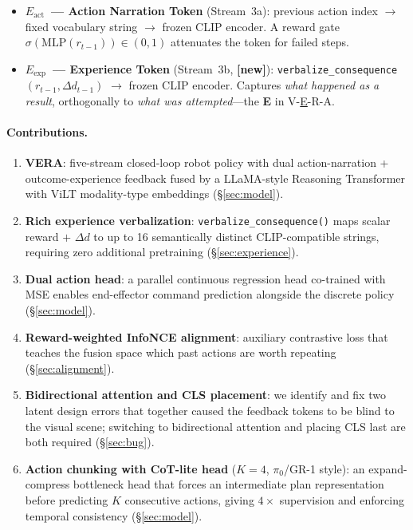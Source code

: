 \documentclass{article}
\newcommand{\modelname}{\textsc{VERA}\xspace}
\newcommand{\Lact}{$E_{\mathrm{act}}$\xspace}
\newcommand{\Lexp}{$E_{\mathrm{exp}}$\xspace}
\newcommand{\NEW}{\textcolor{NewOrange}{\textbf{[new]}}\xspace}
\begin{document}
\begin{itemize}[leftmargin=1.5em,itemsep=2pt]
\item \textbf{\Lact\ — Action Narration Token} (Stream~3a): previous action
  index $\to$ fixed vocabulary string $\to$ frozen CLIP encoder.
  A reward gate $\sigma(\mathrm{MLP}(r_{t-1}))\!\in\!(0,1)$ attenuates
  the token for failed steps.
\item \textbf{\Lexp\ — Experience Token} (Stream~3b, \NEW):
  \texttt{verbalize\_consequence}$(r_{t-1}, \Delta d_{t-1})$ $\to$
  frozen CLIP encoder. Captures \emph{what happened as a result},
  orthogonally to \emph{what was attempted}---the \textbf{E} in
  V-\underline{E}-R-A.
\end{itemize}

\paragraph{Contributions.}
\begin{enumerate}[leftmargin=1.5em,itemsep=2pt]
\item \textbf{\modelname}: five-stream closed-loop robot policy with dual
  action-narration + outcome-experience feedback fused by a LLaMA-style
  Reasoning Transformer with ViLT modality-type embeddings (\S\ref{sec:model}).
\item \textbf{Rich experience verbalization}: \texttt{verbalize\_consequence()}
  maps scalar reward $+$ $\Delta d$ to up to 16 semantically distinct
  CLIP-compatible strings, requiring zero additional pretraining
  (\S\ref{sec:experience}).
\item \textbf{Dual action head}: a parallel continuous regression head
  co-trained with MSE enables end-effector command prediction alongside the
  discrete policy (\S\ref{sec:model}).
\item \textbf{Reward-weighted InfoNCE alignment}: auxiliary contrastive loss
  that teaches the fusion space which past actions are worth repeating
  (\S\ref{sec:alignment}).
\item \textbf{Bidirectional attention and CLS placement}: we identify and
  fix two latent design errors that together caused the feedback tokens to
  be blind to the visual scene; switching to bidirectional attention and
  placing CLS last are both required (\S\ref{sec:bug}).
\item \textbf{Action chunking with CoT-lite head} ($K{=}4$, $\pi_0$/GR-1
  style): an expand-compress bottleneck head that forces an intermediate
  plan representation before predicting $K$ consecutive actions, giving
  $4{\times}$ supervision and enforcing temporal consistency (\S\ref{sec:model}).
\end{enumerate}
\end{document}
